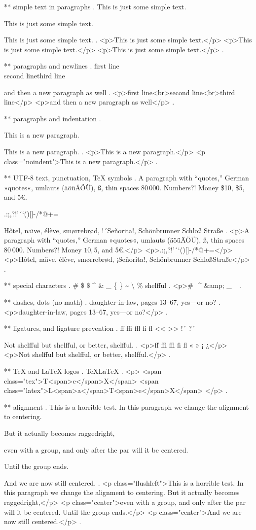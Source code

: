 ** simple text in paragraphs
.
This is just some simple text.

This is just some simple text.

This is just some simple text.
.
<p>This is just some simple text.</p>
<p>This is just some simple text.</p>
<p>This is just some simple text.</p>
.


** paragraphs and newlines
.
first line\\second line\newline third line\par and then a new paragraph as well
.
<p>ﬁrst line<br>second line<br>third line</p>
<p>and then a new paragraph as well</p>
.


** paragraphs and indentation
.
\noindent

\noindent

This is a new paragraph.

\noindent
This is a new paragraph.
.
<p>This is a new paragraph.</p>
<p class="noindent">This is a new paragraph.</p>
.


** UTF-8 text, punctuation, TeX symbols
.
A para\-graph with “quotes,” German »quotes«, umlauts (äöüÄÖÜ), ß, thin spaces 80\,000. Numbers?! Money \$10, \$5, and 5€.

.:;,?!'´`()[]-/*@+=

H\^otel, na\"\i ve, \'el\`eve, sm\o rrebr\o d, !´Se\~norita!, Sch\"onbrunner Schlo\ss{} Stra\ss e
.
<p>A para­graph with “quotes,” German »quotes«, umlauts (äöüÄÖÜ), ß, thin spaces 80 000. Numbers?! Money $10, $5, and 5€.</p>
<p>.:;,?!’´‘()[]‐/*@+=</p>
<p>Hôtel, naı̈ve, élève, smørrebrød, ¡Señorita!, Schönbrunner Schloß​ Straße</p>
.


** special characters
.
\# \$ \$ \^{} \& \_ \{ \} \~{} \textbackslash{} \% shelf\-ful
.
<p># $ $ ^​ &amp; _ { } ~​ \​ %
.


** dashes, dots (no math)
.
daughter-in-law, pages 13--67, yes---or no?
.
<p>daughter‐in‐law, pages 13–67, yes—or no?</p>
.


** ligatures, and ligature prevention
.
ff ffi ffl fi fl << >> !´ ?´

Not shelfful but shelf\mbox{}ful, or better, shelf\/ful.
.
<p>ﬀ ﬃ ﬄ ﬁ ﬂ « » ¡ ¿</p>
<p>Not shelﬀul but shelfful, or better, shelf‌ful.</p>
.


** TeX and LaTeX logos
.
\TeX \LaTeX
.
<p>
<span class="tex">T<span>e</span>X</span>
<span class="latex">L<span>a</span>T<span>e</span>X</span>
</p>
.


** alignment
.
This is a horrible test.
\centering
In this paragraph we change the alignment to centering.
{\raggedright But it actually becomes raggedright,

even with a group, and only after the par will it be centered.}
Until the group ends.

And we are now still centered.
.
<p class="flushleft">This is a horrible test. In this paragraph we change the alignment to centering. But it actually becomes raggedright,</p>
<p class="center">even with a group, and only after the par will it be centered.​ Until the group ends.</p>
<p class="center">And we are now still centered.</p>
.
